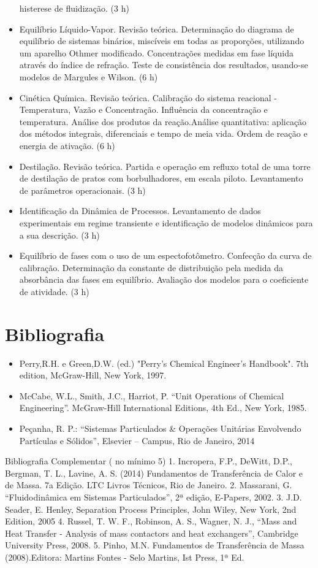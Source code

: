 \begin{itemize}
histerese de fluidização. (3 h)
\item  Equilíbrio Líquido-Vapor. Revisão teórica. Determinação do diagrama de equilíbrio
de sistemas binários, miscíveis em todas as proporções, utilizando um aparelho
Othmer modificado. Concentrações medidas em fase líquida através do índice de
refração. Teste de consistência dos resultados, usando-se modelos de Margules e
Wilson. (6 h)
\item Cinética Química. Revisão teórica. Calibração do sistema reacional - Temperatura,
Vazão e Concentração. Influência da concentração e temperatura. Análise dos
produtos da reação.Análise quantitativa: aplicação dos métodos integrais, diferenciais
e tempo de meia vida. Ordem de reação e energia de ativação. (6 h)
\item  Destilação. Revisão teórica. Partida e operação em refluxo total de uma torre de
destilação de pratos com borbulhadores, em escala piloto. Levantamento de
parâmetros operacionais. (3 h)
\item  Identificação da Dinâmica de Processos. Levantamento de dados experimentais
em regime transiente e identificação de modelos dinâmicos para a sua descrição. (3
h)
\item  Equilíbrio de fases com o uso de um espectofotômetro. Confecção da curva de
calibração. Determinação da constante de distribuição pela medida da absorbância
das fases em equilíbrio. Avaliação dos modelos para o coeficiente de atividade. (3 h) 
\end{itemize}

\section{Bibliografia}

\begin{itemize}
\item  Perry,R.H. e Green,D.W. (ed.) "Perry's Chemical Engineer's Handbook". 7th edition,
McGraw-Hill, New York, 1997.
\item  McCabe, W.L., Smith, J.C., Harriot, P. “Unit Operations of Chemical Engineering”.
McGraw-Hill International Editions, 4th Ed., New York, 1985.
\item  Peçanha, R. P.: “Sistemas Particulados \& Operações Unitárias Envolvendo
Partículas e Sólidos”, Elsevier – Campus, Rio de Janeiro, 2014				
\end{itemize}


Bibliografia Complementar ( no mínimo 5)
1. Incropera, F.P., DeWitt, D.P., Bergman, T. L., Lavine, A. S. (2014) Fundamentos de
Transferência de Calor e de Massa. 7a
Edição. LTC Livros Técnicos, Rio de Janeiro.
2. Massarani, G. “Fluidodinâmica em Sistemas Particulados”, 2ª edição, E-Papers,
2002.
3. J.D. Seader, E. Henley, Separation Process Principles, John Wiley, New
York, 2nd Edition, 2005
4. Russel, T. W. F., Robinson, A. S., Wagner, N. J., “Mass and Heat Transfer -
Analysis of mass contactors and heat exchangers”, Cambridge University Press, 2008.
5. Pinho, M.N. Fundamentos de Transferência de Massa (2008).Editora: Martins
Fontes - Selo Martins, Ist Press, 1ª Ed.



